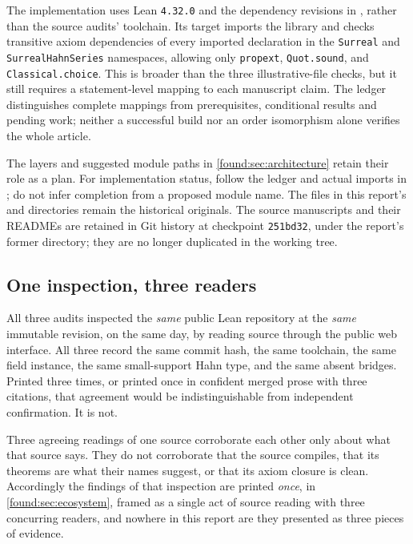 \documentclass[11pt,letterpaper]{article}
\numberwithin{equation}{section}
\theoremstyle{definition}
\theoremstyle{remark}
\begin{document}
The implementation uses Lean \texttt{4.32.0} and the dependency revisions in
, rather than the source audits' toolchain. Its
 target imports the library and checks transitive axiom
dependencies of every imported declaration in the \texttt{Surreal} and
\texttt{SurrealHahnSeries} namespaces, allowing only \texttt{propext},
\texttt{Quot.sound}, and \texttt{Classical.choice}. This is broader than the
three illustrative-file checks, but it still requires a statement-level mapping
to each manuscript claim. The ledger distinguishes complete mappings from
prerequisites, conditional results and pending work; neither a successful build
nor an order isomorphism alone verifies the whole article.

The layers and suggested module paths in \cref{found:sec:architecture} retain
their role as a plan. For implementation status, follow the ledger and actual
imports in ; do not infer completion from a proposed module
name. The files in this report's  and  directories
remain the historical originals. The source manuscripts and their READMEs are
retained in Git history at checkpoint \texttt{251bd32}, under the report's
former  directory; they are no longer duplicated in the working
tree.

\subsection{One inspection, three readers}
\label{found:sub:onethree}
All three audits inspected the \emph{same} public Lean repository at the
\emph{same} immutable revision, on the same day, by reading source through the
public web interface. All three record the same commit hash, the same
toolchain, the same field instance, the same small-support Hahn type, and the
same absent bridges. Printed three times, or printed once in confident merged
prose with three citations, that agreement would be indistinguishable from
independent confirmation. It is not.

Three agreeing readings of one source corroborate each other only about what
that source says. They do not corroborate that the source compiles, that its
theorems are what their names suggest, or that its axiom closure is clean.
Accordingly the findings of that inspection are printed \emph{once}, in
\cref{found:sec:ecosystem}, framed as a single act of source reading with three
concurring readers, and nowhere in this report are they presented as three
pieces of evidence.
\end{document}
